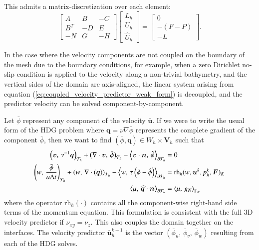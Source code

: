 This admits a matrix-discretization over each element:
\begin{equation}
  \begin{bmatrix}
   A   &  B & -C \\
   B^T &  -D & E \\
   -N & G &  -H
  \end{bmatrix}
  \begin{bmatrix} L_h \\ U_h \\ \widehat{U}_h \end{bmatrix}
  =
  \begin{bmatrix} 0 \\ -(F - P) \\ -L \end{bmatrix}.
\end{equation}

In the case where the velocity components are not coupled on the boundary of the mesh due to the boundary conditions, for example, when a zero Dirichlet no-slip condition is applied to the velocity along a non-trivial bathymetry, and the vertical sides of the domain are axis-aligned, the linear system arising from equation (\ref{eq:coupled_velocity_predictor_weak_form}) is decoupled, and the predictor velocity can be solved component-by-component.

Let $\bar{\phi}$ represent any component of the velocity $\bar{\bm{u}}$.
If we were to write the usual form of the HDG problem where $\bm{q} = \nu \nabla\bar{\phi}$ represents the complete gradient of the component $\bar{\phi}$, then we want to find $(\bar{\phi}, \bm{q})\in W_h\times \bm{V}_h$ such that 
\begin{equation}
  \begin{aligned}
    \left(\bm{v},\, \nu^{-1}\bm{q}\right)_{\mathcal{T}_h} 
    +\left(\nabla \cdot \bm{v},\, \bar{\phi} \right)_{\mathcal{T}_h}
    - \left\langle \bm{v}\cdot\bm{n},\, \hat{\phi} \right\rangle_{\partial\mathcal{T}_h} &=0\\
    \left(w,\, \frac{\bar{\phi}}{a \Delta t} \right)_{\mathcal{T}_h}
    + \left(w,\, \nabla \cdot \left( \bm{q}\right) \right)_{\mathcal{T}_h}
    - \left\langle w,\, \tau\left(\bar{\phi}-\hat{\phi}\right) \right\rangle_{\partial\mathcal{T}_h} 
    &= \text{rh}_h(w,\bm{u}^k,p_h^k, \bm{F})_K \\
    \left\langle \mu,\, \widehat{\bm{q}}\cdot\bm{n} \right\rangle_{\partial\mathcal{T}_h} &= \left\langle \mu,\, g_N \right\rangle_{\Gamma_N}
  \end{aligned}
\end{equation}
where the operator $\text{rh}_h(\cdot)$ contains all the component-wise right-hand side terms of the momentum equation. 
This formulation is consistent with the full 3D velocity predictor if $\nu_{xy}=\nu_z$. 
This also couples the domain together on the interfaces.
The velocity predictor $\bm{\bar{u}}_h^{k+1}$ is the vector $(\bar{\phi}_u,\, \bar{\phi}_v,\, \bar{\phi}_w)$ resulting from each of the HDG solves.

